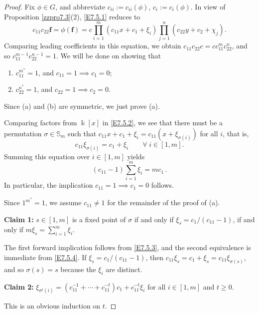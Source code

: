 \documentclass[12pt]{amsart}
\theoremstyle{plain}
\numberwithin{theorem}{section}
\numberwithin{equation}{theorem}
\theoremstyle{definition}
\newcommand{\SB}{\mathbb{S}}
\newcommand \bff {{\mathbf{f}}}
\begin{document}
\begin{proof}
Fix $\phi \in G$, and abbreviate $c_{ii} := c_{ii}(\phi)$, $c_i := c_i(\phi)$.  In view of Proposition \ref{zzpro7.3}(2), \eqref{E7.5.1} reduces to
\begin{equation}  \label{E7.5.2}  \tag{E7.5.2}
c_{11} c_{22} \bff = \phi(\bff) = c \prod_{i=1}^m (c_{11}x+c_1 +\xi_i) \prod_{j=1}^n (c_{22}y+c_2 + \chi_j).
\end{equation}
Comparing leading coefficients in this equation, we obtain $c_{11} c_{22} c = c c_{11}^m c_{22}^n$, and so $c_{11}^{m-1} c_{22}^{n-1} = 1$.  We will be done on showing that
\begin{enumerate}
\item[(a)]
$c_{11}^{m^*} = 1$, and $c_{11} = 1 \implies c_1 = 0$;
\item[(b)]
$c_{22}^{n^*} = 1$, and $c_{22} = 1 \implies c_2 = 0$.
\end{enumerate}
Since (a) and (b) are symmetric, we just prove (a).

Comparing factors from $\Bbbk[x]$ in \eqref{E7.5.2}, we see that there must be a permutation $\sigma \in \SB_m$ such that $c_{11}x + c_1 + \xi_i = c_{11}(x + \xi_{\sigma(i)})$ for all $i$, that is,
\begin{equation}  \label{E7.5.3}  \tag{E7.5.3}
c_{11} \xi_{\sigma(i)} = c_1 + \xi_i \qquad \forall\; i \in [1,m].
\end{equation}
Summing this equation over $i \in [1,m]$ yields 
\begin{equation}  \label{E7.5.4}  \tag{E7.5.4}
(c_{11}-1) \sum_{i=1}^m \xi_i = m c_1 \,.
\end{equation}
In particular, the implication $c_{11}  = 1 \implies c_1 = 0$ follows.

Since $1^{m^*} = 1$, we assume $c_{11} \ne 1$ for the remainder of the proof of (a).

\textbf{Claim 1:} $s \in [1,m]$ is a fixed point of $\sigma$ if and only if $\xi_s = c_1/(c_{11}-1)$, if and only if $m \xi_s = \sum_{i=1}^m \xi_i$.

The first forward implication follows from \eqref{E7.5.3}, and the second equivalence is immediate from \eqref{E7.5.4}.  If $\xi_s = c_1/(c_{11}-1)$, then $c_{11} \xi_s = c_1 + \xi_s = c_{11} \xi_{\sigma(s)}$, and so $\sigma(s) = s$ because the $\xi_i$ are distinct.

\textbf{Claim 2:} $\xi_{\sigma^t(i)} = (c_{11}^{-1} + \cdots + c_{11}^{-t}) c_1 + c_{11}^{-t} \xi_i$ for all $i \in [1,m]$ and $t \ge 0$.

This is an obvious induction on $t$.


\end{proof}
\end{document}
